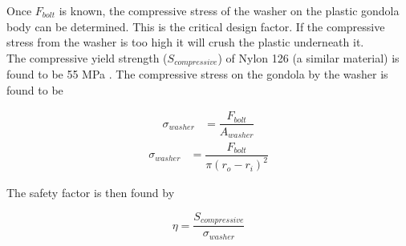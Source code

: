 \documentclass[../main.tex]{subfiles}
\begin{document}
Once $F_{bolt}$ is known, the compressive stress of the washer on the plastic gondola body can be determined. This is the critical design factor. If the compressive stress from the washer is too high it will crush the plastic underneath it.\\

The compressive yield strength ($S_{compressive}$) of Nylon 126 (a similar material) is found to be 55 MPa \cite{Compressive}. The compressive stress on the gondola by the washer is found to be 

\begin{align*}
\sigma _{washer} &= \dfrac{F_{bolt}}{A_{washer}}
\end{align*}
\begin{align}
\sigma _{washer} &= \dfrac{F_{bolt}}{\pi (r_o - r_i)^2}
\end{align}

The safety factor is then found by

\begin{displaymath}
\eta = \dfrac{S_{compressive}}{\sigma _{washer}}
\end{displaymath}
\end{document}
